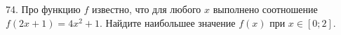 74. Про функцию $f$ известно, что для любого $x$ выполнено соотношение $f(2x+1)=4x^2+1.$ Найдите наибольшее значение $f(x)$ при $x\in[0;2].$\\
